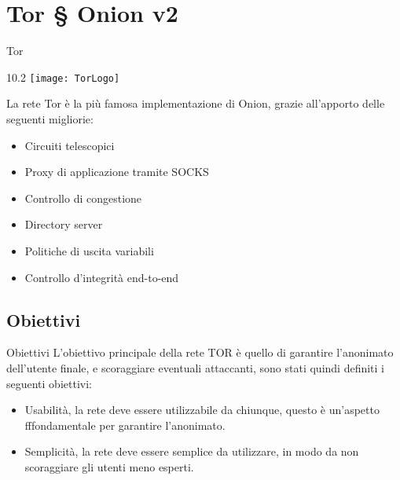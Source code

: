 \section{Tor § Onion v2}
\begin{frame}{Tor}
    \begin{wrapfigure}{1}{0.2\textwidth}
        \centering
        \texttt{[image: TorLogo]}
    \end{wrapfigure}

    La rete Tor è la più famosa implementazione di Onion, grazie all'apporto delle seguenti migliorie:
    \begin{itemize}
        \item Circuiti telescopici
        \item Proxy di applicazione tramite SOCKS
        \item Controllo di congestione
        \item Directory server
        \item Politiche di uscita variabili
        \item Controllo d'integrità end-to-end
    \end{itemize}
\end{frame}

\subsection{Obiettivi}
\begin{frame}{Obiettivi}
    L'obiettivo principale della rete TOR è quello di garantire l'anonimato dell'utente finale, e scoraggiare eventuali attaccanti, sono stati quindi definiti i seguenti obiettivi:
    \begin{itemize}
        \item Usabilità, la rete deve essere utilizzabile da chiunque, questo è un'aspetto fffondamentale per garantire l'anonimato.
        \item Semplicità, la rete deve essere semplice da utilizzare, in modo da non scoraggiare gli utenti meno esperti.
    \end{itemize}
\end{frame}

